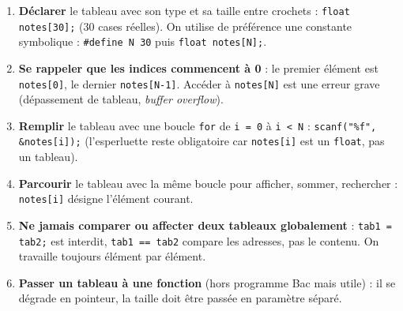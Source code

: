 \documentclass[11pt]{article}
\begin{document}
\begin{methode}
\begin{enumerate}
\item \textbf{Déclarer} le tableau avec son type et sa taille entre crochets : \texttt{float notes[30];} (30 cases réelles). On utilise de préférence une constante symbolique : \texttt{\#define N 30} puis \texttt{float notes[N];}.
\item \textbf{Se rappeler que les indices commencent à 0} : le premier élément est \texttt{notes[0]}, le dernier \texttt{notes[N-1]}. Accéder à \texttt{notes[N]} est une erreur grave (dépassement de tableau, \emph{buffer overflow}).
\item \textbf{Remplir} le tableau avec une boucle \texttt{for} de \texttt{i = 0} à \texttt{i < N} : \texttt{scanf("\%f", \&notes[i]);} (l'esperluette reste obligatoire car \texttt{notes[i]} est un \texttt{float}, pas un tableau).
\item \textbf{Parcourir} le tableau avec la même boucle pour afficher, sommer, rechercher : \texttt{notes[i]} désigne l'élément courant.
\item \textbf{Ne jamais comparer ou affecter deux tableaux globalement} : \texttt{tab1 = tab2;} est interdit, \texttt{tab1 == tab2} compare les adresses, pas le contenu. On travaille toujours élément par élément.
\item \textbf{Passer un tableau à une fonction} (hors programme Bac mais utile) : il se dégrade en pointeur, la taille doit être passée en paramètre séparé.
\end{enumerate}
\end{methode}
\end{document}

